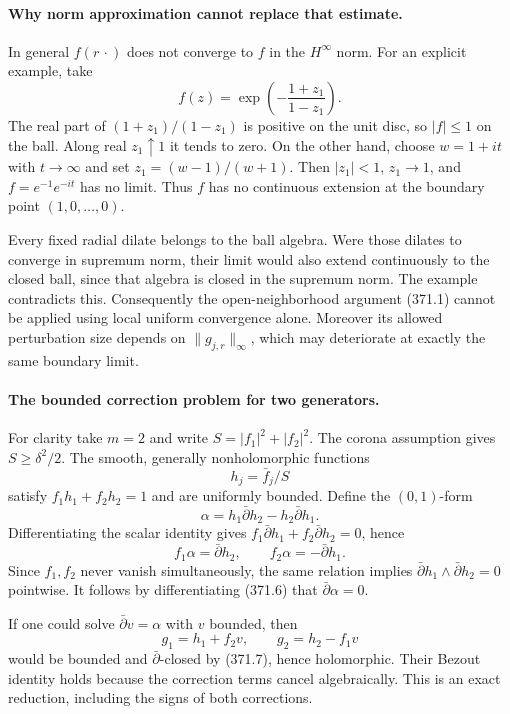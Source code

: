 \documentclass[11pt]{article}
\begin{document}
\paragraph{Why norm approximation cannot replace that estimate.}
In general $f(r\,\cdot)$ does not converge to $f$ in the
$H^\infty$ norm. For an explicit example, take
\[
 f(z)=\exp\left(-\frac{1+z_1}{1-z_1}\right).
 \tag{371.5}
\]
The real part of $(1+z_1)/(1-z_1)$ is positive on the unit
disc, so $|f|\leq1$ on the ball. Along real $z_1\uparrow1$
it tends to zero. On the other hand, choose
$w=1+it$ with $t\to\infty$ and set
$z_1=(w-1)/(w+1)$. Then $|z_1|<1$, $z_1\to1$, and
$f=e^{-1}e^{-it}$ has no limit. Thus $f$ has no continuous
extension at the boundary point $(1,0,\ldots,0)$.

Every fixed radial dilate belongs to the ball algebra. Were those
dilates to converge in supremum norm, their limit would also
extend continuously to the closed ball, since that algebra is
closed in the supremum norm. The example contradicts this.
Consequently the open-neighborhood argument (371.1) cannot be
applied using local uniform convergence alone. Moreover its
allowed perturbation size depends on $\|g_{j,r}\|_\infty$,
which may deteriorate at exactly the same boundary limit.

\paragraph{The bounded correction problem for two generators.}
For clarity take $m=2$ and write
$S=|f_1|^2+|f_2|^2$. The corona assumption gives
$S\geq\delta^2/2$. The smooth, generally nonholomorphic functions
\[
 h_j=\bar f_j/S
\]
satisfy $f_1h_1+f_2h_2=1$ and are uniformly bounded. Define the
$(0,1)$-form
\[
 \alpha=h_1\bar\partial h_2-h_2\bar\partial h_1.
 \tag{371.6}
\]
Differentiating the scalar identity gives
$f_1\bar\partial h_1+f_2\bar\partial h_2=0$, hence
\[
 f_1\alpha=\bar\partial h_2,
       \qquad f_2\alpha=-\bar\partial h_1.
 \tag{371.7}
\]
Since $f_1,f_2$ never vanish simultaneously, the same relation
implies $\bar\partial h_1\wedge\bar\partial h_2=0$ pointwise.
It follows by differentiating (371.6) that
$\bar\partial\alpha=0$.

If one could solve $\bar\partial v=\alpha$ with $v$ bounded,
then
\[
 g_1=h_1+f_2v,\qquad g_2=h_2-f_1v
 \tag{371.8}
\]
would be bounded and $\bar\partial$-closed by (371.7), hence
holomorphic. Their Bezout identity holds because the correction
terms cancel algebraically. This is an exact reduction, including
the signs of both corrections.
\end{document}
